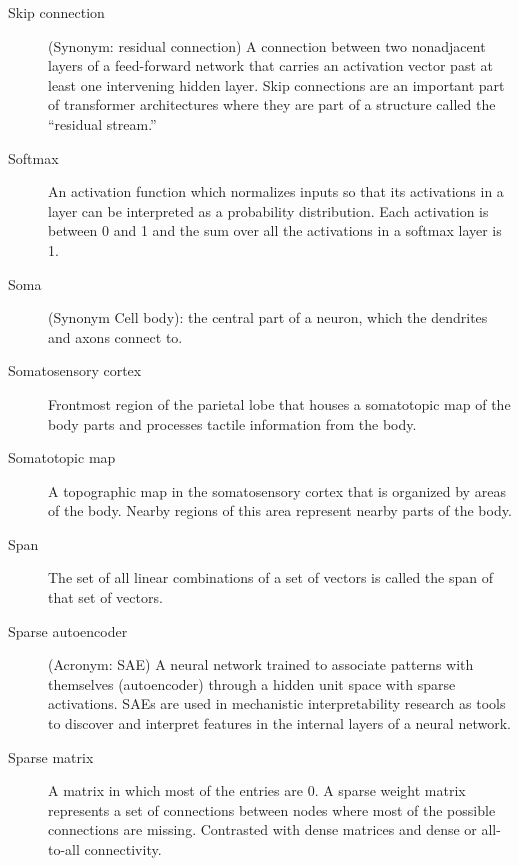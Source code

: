 \begin{description}
\item[Skip connection] (Synonym: residual connection) A connection between two nonadjacent layers of a feed-forward network that carries an activation vector past at least one intervening hidden layer. Skip connections are an important part of transformer architectures where they are part of a structure called the ``residual stream.''


\item[Softmax] An activation function which normalizes inputs so that its activations in a layer can be interpreted as a probability distribution. Each activation is between 0 and 1 and the sum over all the activations in a softmax layer is 1.

\item[Soma] (Synonym Cell body): the central part of a neuron, which the dendrites and axons connect to.

\item[Somatosensory cortex] Frontmost region of the parietal lobe that houses a somatotopic map of the body parts and processes tactile information from the body.

\item[Somatotopic map] A topographic map in the somatosensory cortex that is organized by areas of the body. Nearby regions of this area represent nearby parts of the body.

\item[Span] The set of all linear combinations of a set of vectors is called the span of that set of vectors.

\item[Sparse autoencoder] (Acronym: SAE) A neural network trained to associate patterns with themselves (autoencoder) through a hidden unit space with sparse activations. SAEs are used in mechanistic interpretability research as tools to discover and interpret features in the internal layers of a neural network.

\item[Sparse matrix] A matrix in which most of the entries are 0. A sparse weight matrix represents a set of connections between nodes where most of the possible connections are missing. Contrasted with dense matrices and dense or all-to-all connectivity.


\end{description}
